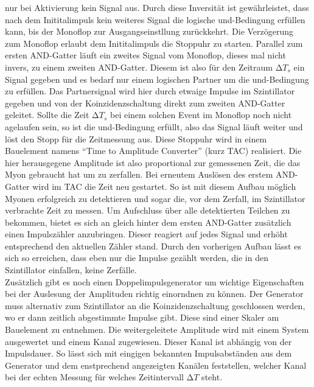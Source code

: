 nur bei Aktivierung kein Signal aus. Durch diese Inversität ist gewährleistet, dass nach dem Inititalimpuls kein weiteres Signal die logische und-Bedingung erfüllen kann, bis 
der Monoflop zur Ausgangseinstllung zurückkehrt. Die Verzögerung zum Monoflop erlaubt dem Inititalimpuls die Stoppuhr zu starten. 
Parallel zum ersten AND-Gatter läuft ein zweites Signal vom Monoflop, dieses mal nicht invers, zu einem zweiten AND-Gatter.
Diesem ist also für den Zeitraum $\increment T_s$ ein Signal gegeben und es bedarf nur einem logischen Partner um die und-Bedingung zu erfüllen. 
Das Partnersignal wird hier durch etwaige Impulse im Szintillator gegeben und von der Koinzidenzschaltung direkt zum zweiten AND-Gatter geleitet.
Sollte die Zeit $\increment T_s$ bei einem solchen Event im Monoflop noch nicht agelaufen sein, so ist die und-Bedingung erfüllt,
also das Signal läuft weiter und löst den Stopp für die Zeitmessung aus.
Diese Stoppuhr wird in einem Bauelement namens \enquote{Time to Amplitude Converter} (kurz TAC) realisiert. 
Die hier herausgegene Amplitude ist also proportional zur gemessenen Zeit, die das Myon gebraucht hat um zu zerfallen. Bei erneutem Auslösen des erstem AND-Gatter wird 
im TAC die Zeit neu gestartet.
So ist mit diesem Aufbau möglich Myonen erfolgreich zu detektieren und sogar die, vor dem Zerfall, im Szintillator verbrachte Zeit zu messen.
Um Aufschluss über alle detektierten Teilchen zu bekommen, bietet es sich an gleich hinter dem ersten AND-Gatter zusätzlich einen Impulszähler anzubringen. 
Dieser reagiert auf jedes Signal und erhöht entsprechend den aktuellen Zähler stand. Durch den vorherigen Aufbau lässt es sich so erreichen, dass eben nur die Impulse gezählt werden, die 
in den Szintillator einfallen, keine Zerfälle.
\\
\newline
Zusätzlich gibt es noch einen Doppelimpulsgenerator um wichtige Eigenschaften bei der Auslesung der Amplituden 
richtig einorndnen zu können. Der Generator muss alternativ zum Szintillator an die Koinzidenzschaltung geschlossen werden,
wo er dann zeitlich abgestimmte Impulse gibt. Diese sind einer Skaler am Bauelement zu entnehmen. 
Die weitergeleitete Amplitude wird mit einem System ausgewertet und einem Kanal zugewiesen. Dieser Kanal ist abhängig 
von der Impulsdauer. So lässt sich mit eingigen bekannten Impulsabständen aus dem Generator und dem enstprechend angezeigten Kanälen
feststellen, welcher Kanal bei der echten Messung für welches Zeitintervall $\increment T$ steht.











